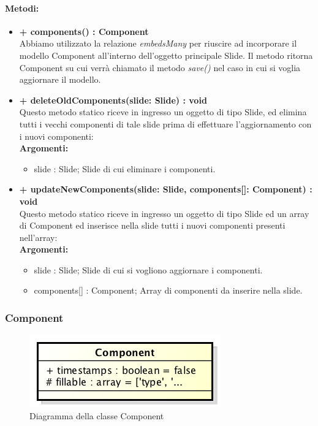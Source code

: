 	\paragraph{Metodi:}
	\begin{itemize}
		\item \textbf{+ components() : Component}\\
		Abbiamo utilizzato la relazione \textit{embedsMany} per riuscire ad incorporare il modello Component all'interno dell'oggetto principale Slide. Il metodo ritorna Component su cui verrà chiamato il metodo \textit{save()} nel caso in cui si voglia aggiornare il modello.
		\item \textbf{+ deleteOldComponents(slide: Slide) : void}\\
		Questo metodo statico riceve in ingresso un oggetto di tipo Slide, ed elimina tutti i vecchi componenti di tale slide prima di effettuare l'aggiornamento con i nuovi componenti:\\
		\textbf{Argomenti:}
		\begin{itemize}
			\item slide : Slide;
			Slide di cui eliminare i componenti.
		\end{itemize}
		\newpage
		\item \textbf{+ updateNewComponents(slide: Slide, components[]: Component) : void}\\
		Questo metodo statico riceve in ingresso un oggetto di tipo Slide ed un array di Component ed inserisce nella slide tutti i nuovi componenti presenti nell'array:\\
		\textbf{Argomenti:}
		\begin{itemize}
			\item slide : Slide;
			Slide di cui si vogliono aggiornare i componenti.
			\item components[] : Component;
			Array di componenti da inserire nella slide.
		\end{itemize}
	\end{itemize}
	\newpage
	

\subsubsection{Component}

	\begin{figure}[h]
		\centering
		\includegraphics[width=0.5\linewidth]{img/back_end_premi_model_component}
		\caption[Diagramma della classe Component]{Diagramma della classe Component}
		\label{fig:back_end_premi_model_component}
	\end{figure}


